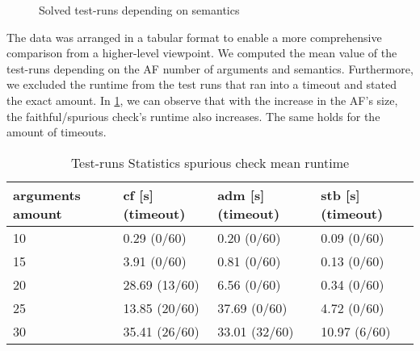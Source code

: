 \begin{figure}[H]
    \centering
    \caption{Solved test-runs depending on semantics}
    \label{fig:expfaithful/Semantics/OnePlot}
\end{figure}


The data was arranged in a tabular format to enable a more comprehensive comparison from a higher-level viewpoint. We computed the mean value of the test-runs depending on the AF number of arguments and semantics. Furthermore, we excluded the runtime from the test runs that ran into a timeout and stated the exact amount. In \cref{table:ExperimentStatisticsFaithfulCheck}, we can observe that with the increase in the AF's size, the faithful/spurious check's runtime also increases. The same holds for the amount of timeouts.


\begin{table}[htb]
    \centering
    \caption{Test-runs Statistics spurious check mean runtime}
    \begin{tabular}{ |l|l|l|l| }
        \hline
            arguments amount & cf [s] (timeout)& adm [s] (timeout)& stb [s] (timeout)\\
        \hline
            10 &   0.29 \hfill(0/60)  &   0.20 \hfill (0/60)  &   0.09 \hfill (0/60) \\
            15 &   3.91 \hfill(0/60)  &   0.81 \hfill (0/60)  &   0.13 \hfill (0/60) \\
            20 &  28.69 \hfill(13/60) &   6.56 \hfill (0/60)  &   0.34 \hfill (0/60) \\
            25 &  13.85 \hfill(20/60) &  37.69 \hfill (0/60)  &   4.72 \hfill (0/60) \\
            30 &  35.41 \hfill(26/60) &  33.01 \hfill (32/60) &  10.97 \hfill (6/60) \\
        \hline
    \end{tabular}
\label{table:ExperimentStatisticsFaithfulCheck}
\end{table}


